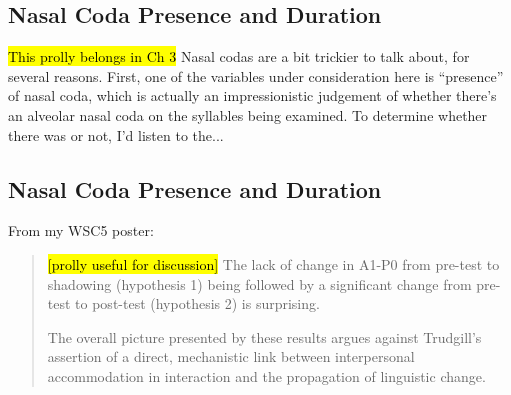 

        \subsection{Nasal Coda Presence and Duration}
        \hl{This prolly belongs in Ch 3} Nasal codas are a bit trickier to talk about, for several reasons. First, one of the variables under consideration here is ``presence'' of nasal coda, which is actually an impressionistic judgement of whether there's an alveolar nasal coda on the syllables being examined. To determine whether there was or not, I'd listen to the...%

        \subsection{Nasal Coda Presence and Duration}


    
    From my WSC5 poster:
    \begin{quote}
    
    
    \hl{[prolly useful for discussion]} The lack of change in A1-P0 from pre-test to shadowing (hypothesis 1) being followed by a significant change from pre-test to post-test (hypothesis 2) is surprising.
    
    The overall picture presented by these results argues against Trudgill’s assertion of a direct, mechanistic link between interpersonal accommodation in interaction and the propagation of linguistic change.
    \end{quote}

